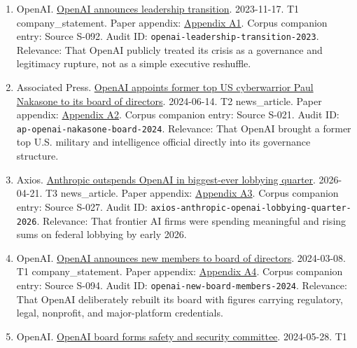 \documentclass[
  american,
  11pt,
  letterpaper,
]{article}
\providecommand{\tightlist}{%
  \setlength{\itemsep}{0pt}\setlength{\parskip}{0pt}}
\begin{document}
\begin{enumerate}
\def\labelenumi{\arabic{enumi}.}
\tightlist
\item
  OpenAI.
  \href{https://openai.com/index/openai-announces-leadership-transition/}{OpenAI
  announces leadership transition}. 2023-11-17. T1 company\_statement.
  Paper appendix:
  \hyperref[appendix-a1-openai-announces-leadership-transition]{Appendix
  A1}. Corpus companion entry: Source S-092. Audit ID:
  \texttt{openai-leadership-transition-2023}. Relevance: That OpenAI
  publicly treated its crisis as a governance and legitimacy rupture,
  not as a simple executive reshuffle.
\item
  Associated Press.
  \href{https://apnews.com/article/6ef612a3a0fcaef05480bbd1ebbd79b1}{OpenAI
  appoints former top US cyberwarrior Paul Nakasone to its board of
  directors}. 2024-06-14. T2 news\_article. Paper appendix:
  \hyperref[appendix-a2-openai-appoints-former-top-us-cyberwarrior-paul-nakasone-to-its-board-of-directors]{Appendix
  A2}. Corpus companion entry: Source S-021. Audit ID:
  \texttt{ap-openai-nakasone-board-2024}. Relevance: That OpenAI brought
  a former top U.S. military and intelligence official directly into its
  governance structure.
\item
  Axios.
  \href{https://www.axios.com/2026/04/21/anthropic-outspends-openai-biggest-lobbying-quarter}{Anthropic
  outspends OpenAI in biggest-ever lobbying quarter}. 2026-04-21. T3
  news\_article. Paper appendix:
  \hyperref[appendix-a3-anthropic-outspends-openai-in-biggest-ever-lobbying-quarter]{Appendix
  A3}. Corpus companion entry: Source S-027. Audit ID:
  \texttt{axios-anthropic-openai-lobbying-quarter-2026}. Relevance: That
  frontier AI firms were spending meaningful and rising sums on federal
  lobbying by early 2026.
\item
  OpenAI.
  \href{https://openai.com/index/openai-announces-new-members-to-board-of-directors/}{OpenAI
  announces new members to board of directors}. 2024-03-08. T1
  company\_statement. Paper appendix:
  \hyperref[appendix-a4-openai-announces-new-members-to-board-of-directors]{Appendix
  A4}. Corpus companion entry: Source S-094. Audit ID:
  \texttt{openai-new-board-members-2024}. Relevance: That OpenAI
  deliberately rebuilt its board with figures carrying regulatory,
  legal, nonprofit, and major-platform credentials.
\item
  OpenAI.
  \href{https://openai.com/index/openai-board-forms-safety-and-security-committee/}{OpenAI
  board forms safety and security committee}. 2024-05-28. T1

\end{enumerate}
\end{document}
